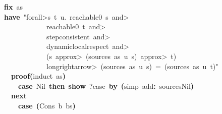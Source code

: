 \documentclass{article}
\newcommand{\syntaxKEYWORDA}[1]{\textcolor[rgb]{0.0,0.4,0.6}{\textbf{#1}}}
\newcommand{\syntaxKEYWORDC}[1]{\textcolor[rgb]{0.0,0.6,1.0}{\textbf{#1}}}
\newcommand{\syntaxLITERALA}[1]{\textcolor[rgb]{1.0,0.0,0.8}{#1}}
\newcommand{\syntaxOPERATOR}[1]{\textcolor[rgb]{0.0,0.0,0.0}{\textbf{#1}}}
\newcommand{\syntaxKEYWORDA}[1]{\textcolor[rgb]{0.0,0.4,0.6}{\textbf{#1}}}
\newcommand{\syntaxKEYWORDC}[1]{\textcolor[rgb]{0.0,0.6,1.0}{\textbf{#1}}}
\newcommand{\syntaxLITERALA}[1]{\textcolor[rgb]{1.0,0.0,0.8}{#1}}
\newcommand{\syntaxOPERATOR}[1]{\textcolor[rgb]{0.0,0.0,0.0}{\textbf{#1}}}
\newcommand{\syntaxKEYWORDA}[1]{\textcolor[rgb]{0.0,0.4,0.6}{\textbf{#1}}}
\newcommand{\syntaxKEYWORDC}[1]{\textcolor[rgb]{0.0,0.6,1.0}{\textbf{#1}}}
\newcommand{\syntaxLITERALA}[1]{\textcolor[rgb]{1.0,0.0,0.8}{#1}}
\newcommand{\syntaxOPERATOR}[1]{\textcolor[rgb]{0.0,0.0,0.0}{\textbf{#1}}}
\newcommand{\syntaxKEYWORDA}[1]{\textcolor[rgb]{0.0,0.4,0.6}{#1}}
\newcommand{\syntaxKEYWORDC}[1]{\textcolor[rgb]{0.0,0.6,1.0}{#1}}
\newcommand{\syntaxLITERALA}[1]{\textcolor[rgb]{1.0,0.0,0.8}{\textbf{#1}}}
\newcommand{\syntaxOPERATOR}[1]{\textcolor[rgb]{0.0,0.0,0.0}{#1}}
\newcommand{\syntaxKEYWORDA}[1]{\textcolor[rgb]{0.0,0.4,0.6}{\textbf{#1}}}
\newcommand{\syntaxKEYWORDC}[1]{\textcolor[rgb]{0.0,0.6,1.0}{\textbf{#1}}}
\newcommand{\syntaxLITERALA}[1]{\textcolor[rgb]{1.0,0.0,0.8}{#1}}
\newcommand{\syntaxOPERATOR}[1]{\textcolor[rgb]{0.0,0.0,0.0}{\textbf{#1}}}
\newcommand{\syntaxKEYWORDA}[1]{\textcolor[rgb]{0.0,0.4,0.6}{\textbf{#1}}}
\newcommand{\syntaxKEYWORDC}[1]{\textcolor[rgb]{0.0,0.6,1.0}{\textbf{#1}}}
\newcommand{\syntaxLITERALA}[1]{\textcolor[rgb]{1.0,0.0,0.8}{#1}}
\newcommand{\syntaxOPERATOR}[1]{\textcolor[rgb]{0.0,0.0,0.0}{\textbf{#1}}}
\begin{document}
{\ }{\ }{\ }{\ }{\ }{\ }{\ }{\ }\syntaxKEYWORDC{fix}{\ }as\hspace*{\fill}\\
{\ }{\ }{\ }{\ }{\ }{\ }{\ }{\ }\syntaxKEYWORDA{have}{\ }\syntaxLITERALA{"\<forall>s{\ }t{\ }u.{\ }reachable0{\ }s{\ }\<and>}\hspace*{\fill}\\
\syntaxLITERALA{{\ }{\ }{\ }{\ }{\ }{\ }{\ }{\ }{\ }{\ }{\ }{\ }{\ }{\ }{\ }{\ }{\ }{\ }{\ }{\ }reachable0{\ }t{\ }\<and>{\ }{\ }{\ }{\ }{\ }{\ }{\ }{\ }{\ }{\ }{\ }{\ }{\ }{\ }{\ }{\ }{\ }{\ }{\ }{\ }{\ }}\hspace*{\fill}\\
\syntaxLITERALA{{\ }{\ }{\ }{\ }{\ }{\ }{\ }{\ }{\ }{\ }{\ }{\ }{\ }{\ }{\ }{\ }{\ }{\ }{\ }{\ }step\usebox{\underscorebox}consistent{\ }\<and>}\hspace*{\fill}\\
\syntaxLITERALA{{\ }{\ }{\ }{\ }{\ }{\ }{\ }{\ }{\ }{\ }{\ }{\ }{\ }{\ }{\ }{\ }{\ }{\ }{\ }{\ }dynamic\usebox{\underscorebox}local\usebox{\underscorebox}respect{\ }\<and>}\hspace*{\fill}\\
\syntaxLITERALA{{\ }{\ }{\ }{\ }{\ }{\ }{\ }{\ }{\ }{\ }{\ }{\ }{\ }{\ }{\ }{\ }{\ }{\ }{\ }{\ }(s{\ }\<approx>{\ }(sources{\ }as{\ }u{\ }s){\ }\<approx>{\ }t)}\hspace*{\fill}\\
\syntaxLITERALA{{\ }{\ }{\ }{\ }{\ }{\ }{\ }{\ }{\ }{\ }{\ }{\ }{\ }{\ }{\ }{\ }{\ }{\ }{\ }{\ }\<longrightarrow>{\ }(sources{\ }as{\ }u{\ }s){\ }={\ }(sources{\ }as{\ }u{\ }t)"}\hspace*{\fill}\\
{\ }{\ }{\ }{\ }{\ }{\ }{\ }{\ }{\ }{\ }\syntaxKEYWORDA{proof}\syntaxOPERATOR{(}induct{\ }as\syntaxOPERATOR{)}\hspace*{\fill}\\
{\ }{\ }{\ }{\ }{\ }{\ }{\ }{\ }{\ }{\ }{\ }{\ }\syntaxKEYWORDC{case}{\ }Nil{\ }\syntaxKEYWORDA{then}{\ }\syntaxKEYWORDC{show}{\ }?case{\ }\syntaxKEYWORDA{by}{\ }\syntaxOPERATOR{(}simp{\ }add\syntaxOPERATOR{:}{\ }sources\usebox{\underscorebox}Nil\syntaxOPERATOR{)}\hspace*{\fill}\\
{\ }{\ }{\ }{\ }{\ }{\ }{\ }{\ }{\ }{\ }\syntaxKEYWORDA{next}\hspace*{\fill}\\
{\ }{\ }{\ }{\ }{\ }{\ }{\ }{\ }{\ }{\ }{\ }{\ }\syntaxKEYWORDC{case}{\ }\syntaxOPERATOR{(}Cons{\ }b{\ }bs\syntaxOPERATOR{)}\hspace*{\fill}\\
\end{document}
